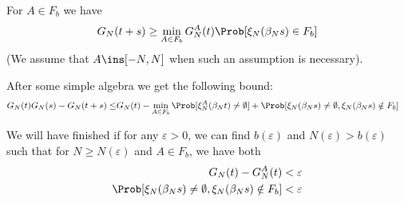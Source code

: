 \documentclass{scrartcl}
\newcommand{\ep}{\varepsilon}
\begin{document}

For $A \in F_b$ we have
\begin{align*}
  G_{N}(t+s)
  \geq \min_{A \in F_{b}} G_{N}^{A}(t) \Prob[\xi_{N}(\beta_{N}s) \in F_{b}]
\end{align*}
(We assume that $A \ins [-N,N]$ when such an assumption is necessary).

After some simple algebra we get the following bound:
\begin{align*}
  G_{N}(t)G_{N}(s) - G_{N}(t+s) \leq& G_{N}(t) - \min_{A \in F_{b}} \Prob[\xi_{N}^{A}(\beta_{N}t) \neq \emptyset]+ \Prob[\xi_{N}(\beta_{N}s) \neq \emptyset, \xi_{N}(\beta_{N}s) \notin F_{b}]
\end{align*}

We will have finished if for any $\ep > 0$, we can find $b(\ep)$ and $N(\ep) > b(\ep)$  such that for $N \geq N(\ep)$ and $A \in F_{b}$, we have both
\begin{align}
  G_{N}(t) - G_{N}^{A}(t) &< \ep \label{eq:firstineq} \\
  \Prob[\xi_{N}(\beta_{N}s) \neq \emptyset, \xi_{N}(\beta_{N}s) \notin F_{b}] &< \ep \label{eq:secondineq}
\end{align}
\end{document}
